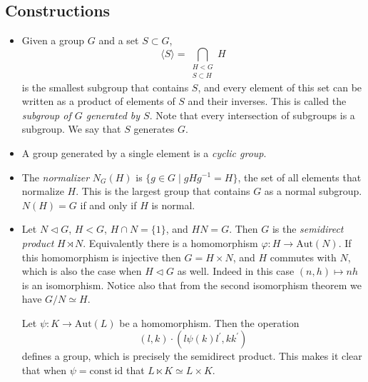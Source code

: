 \documentclass{article}
\begin{document}
\subsection{Constructions}
  \begin{itemize}
    \item{
      Given a group $G$ and a set $S \subset G$,
      $$
      \langle S \rangle = \bigcap_{\substack{H < G \\ S \subset H}} H
      $$
      is the smallest subgroup that contains $S$, and every element of
      this set can be written as a product of elements of $S$ and
      their inverses. This is called the \emph{subgroup of $G$
        generated by $S$}. Note that every intersection of subgroups
      is a subgroup. We say that $S$ generates $G$.
    }
    \item{
      A group generated by a single element is a \emph{cyclic group}.
    }
    \item{
      The \emph{normalizer} $N_G(H)$ is
      $\{ g \in G \mid g H g^{-1} = H \}$, the set of all elements
      that normalize $H$. This is the largest group that contains $G$
      as a normal subgroup. $N(H) = G$ if and only if $H$ is normal.
    }
    \item{
      Let $N \triangleleft G$, $H < G$, $H \cap N = \{ 1 \}$, and $HN
      = G$. Then $G$ is the \emph{semidirect product} $H \rtimes N$.
      Equivalently there is a homomorphism $\varphi : H \to
      \mathrm{Aut}(N)$. If this homomorphism is injective then $G = H
      \times N$, and $H$ commutes with $N$, which is also the case
      when $H \triangleleft G$ as well. Indeed in this case
      $(n, h) \mapsto nh$ is an isomorphism. Notice also that from the
      second isomorphism theorem we have $G / N \simeq H$.

      Let $\psi : K \to \mathrm{Aut}(L)$ be a homomorphism. Then the operation
      $$
      (l, k) \cdot (l \psi(k) l^\prime, k k^\prime)
      $$
      defines a group, which is precisely the semidirect product. This
      makes it clear that when $\psi = \mathrm{const}~\mathrm{id}$
      that $L \ltimes K \simeq L \times K$.

}
\end{itemize}
\end{document}
